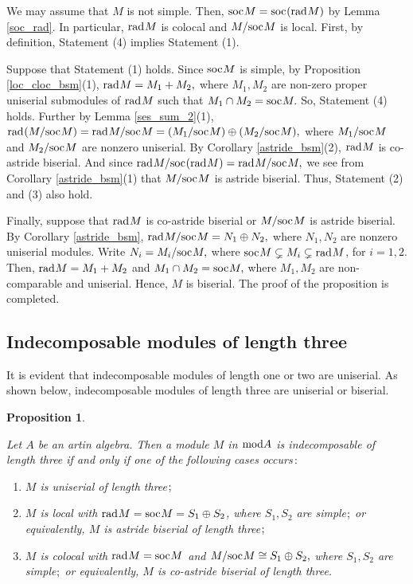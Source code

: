 \documentclass[10pt]{amsart}
\newtheorem{Prop}[Theo]{Proposition}
\theoremstyle{definition}
\newcommand{\mmod}{{\rm mod}}
\newcommand{\rad}{{\rm rad}\hspace{.5pt}}
\newcommand{\soc}{{\rm soc}\hspace{.5pt}}
\newcommand{\hp}{\hspace{.5pt}}
\begin{document}
\vspace{-2pt}

 We may assume that $M$ is not simple. Then, $\soc M=\soc(\rad M)$ by Lemma \ref{soc_rad}. In particular, $\rad M$ is colocal and $M/\soc M$ is local. %
First, by definition, Statement (4) implies Statement (1). 

Suppose that Statement (1) holds. Since $\soc M$ is simple, by Proposition \ref{loc_cloc_bsm}(1), $\rad M=M_1+M_2,$ where $M_1, M_2$ are non-zero proper uniserial submodules of $\rad M$ such that $M_1\cap M_2=\soc M.$ So, Statement (4) holds. Further by Lemma \ref{ses_sum_2}(1), $\rad(M/\soc M)=\rad M/\soc M= (M_1/\soc M)\oplus (M_2/\soc M),$ where $M_1/\soc M$ and $M_2/\soc M$ are nonzero uniserial. By Corollary \ref{astride_bsm}(2), $\rad M$ is co-astride biserial. And since $\rad M/\soc(\rad M)=\rad M/\soc M,$ we see from  Corollary \ref{astride_bsm}(1) that $M/\soc M$ is astride biserial. Thus, Statement (2) and (3) also hold.

Finally, suppose that $\rad M$ is co-astride biserial or $M/\soc M$ is astride biserial. By Corollary \ref{astride_bsm}, 
$\rad M / \soc M=N_1\oplus N_2,$ where $N_1, N_2$ are nonzero uniserial mo\-dules. 
Write $N_i=M_i/\soc M,$ where $\soc M\subsetneq M_i\subsetneq \rad M$, for $i=1, 2$. 
Then,  $\rad M=M_1+M_2$ and $M_1\cap M_2=\soc M,$ where $M_1, M_2$ are non-comparable and uniserial. Hence, $M$ is biserial. The proof of the proposition is completed.

\vspace{-2pt}

\subsection{\sc Indecomposable modules of length three} It is evident that indecomposable modules of length one or two are uniserial. As shown below, indecomposable modules of length three are uniserial or biserial. 

\begin{Prop}\label{CL_3}

Let $A$ be an artin algebra. Then a module $M$ in $\mmod A$ is indecomposable of length three if and only if one of the following cases occurs$\,:$

\begin{enumerate}[$(1)$]

\vspace{-2pt}

\item $M$ is uniserial of length three$\hp\hp;$

\item $M$ is local with $\rad M=\soc M=S_1\oplus S_2$, where $S_1, S_2$ are simple$\hp;$ or equivalently, $M$ is astride biserial of length three$\hp\hp;$

\item $M$ is colocal with $\rad M=\soc M$ and $M/\soc M\cong S_1\oplus S_2,$ where $S_1, S_2$ are simple$\hp;$ or equivalently, $M$ is co-astride biserial of length three.

\end{enumerate} \end{Prop}
\end{document}
